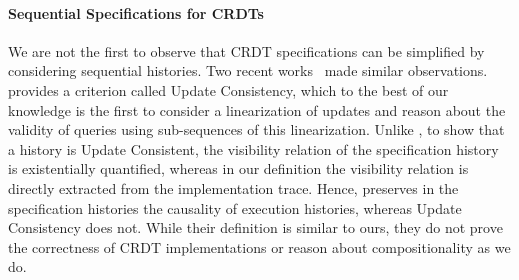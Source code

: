 \paragraph{Sequential Specifications for CRDTs}
We are not the first to observe that CRDT specifications can be
simplified by considering sequential histories.
%
Two recent works~\cite{PerrinMJ14, JagadeesanR18} made similar
observations.
%
\citet{PerrinMJ14} provides a criterion called Update Consistency,
which to the best of our knowledge is the first to consider a
linearization of updates and reason about the validity of queries using sub-sequences
of this linearization.
%
Unlike \CRDTLinshort{}, to show that a history is Update Consistent,
the visibility relation of the specification history is existentially
quantified, whereas in our definition the visibility relation is
directly extracted from the implementation trace.
%
Hence, \CRDTLinshort{} preserves in the specification histories the
causality of execution histories, whereas Update Consistency does not.
%
While their definition is similar to ours, they do not prove the
correctness of CRDT implementations or reason about compositionality as we do.


